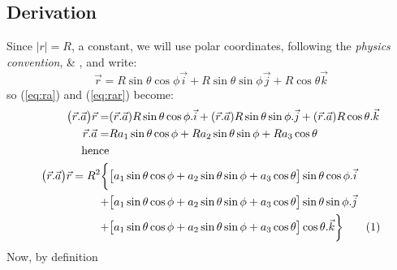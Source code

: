 \documentclass[]{article}
\newcommand\numberthis{\addtocounter{equation}{1}\tag{\theequation}}
\begin{document}
\subsection{Derivation}
Since $|r|=R$, a constant, we will use polar coordinates, following the \emph{physics convention}, \cite{schaum-basic} \& \cite{wiki-polar}, and write:
$$\vec{r}=R\sin\theta\cos\phi\vec{i}+R\sin\theta\sin\phi\vec{j}+R\cos\theta\vec{k}$$
so (\ref{eq:ra}) and (\ref{eq:rar}) become:
\begin{align*}
\big(\vec{r}.\vec{a}\big)\vec{r} =& (\vec{r}.\vec{a}) R \sin\theta\cos\phi .\vec{i} + (\vec{r}.\vec{a})R\sin\theta\sin\phi . \vec{j} + (\vec{r}.\vec{a}) R\cos\theta. \vec{k}\\
\vec{r}.\vec{a} =& Ra_1\sin\theta\cos\phi + Ra_2\sin\theta\sin\phi + Ra_3 \cos\theta\\
\text{hence}&\\
\big(\vec{r}.\vec{a}\big)\vec{r} = R^2 \bigg\{& \big[a_1\sin\theta\cos\phi + a_2\sin\theta\sin\phi + a_3 \cos\theta\big] \sin\theta\cos\phi.\vec{i}\\ +& \big[a_1\sin\theta\cos\phi + a_2\sin\theta\sin\phi + a_3 \cos\theta\big]\sin\theta\sin\phi. \vec{j}\\
 +& \big[a_1\sin\theta\cos\phi + a_2\sin\theta\sin\phi + a_3 \cos\theta\big] \cos\theta. \vec{k}\bigg\}\numberthis \label{eq:rar_expanded}
\end{align*}
Now, by definition
\end{document}
